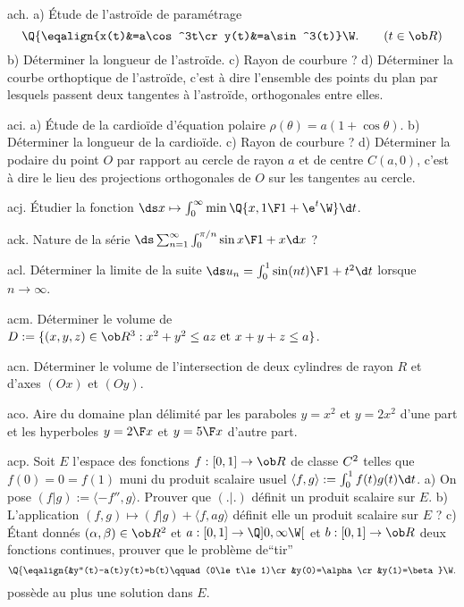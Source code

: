 \exo [Level=2,Fight=2,Learn=1,Field=\RepèreDeFrenet,Type=\Exercices,Origin=\MP] ach. 
a) \'Etude de l'astro\"ide de paramétrage
$$
\Q\{\eqalign{x(t)&=a\cos^3t\cr y(t)&=a\sin^3(t)}\W.\qquad(t\in\ob R)
$$
b) Déterminer la longueur de l'astroïde. \pn 
c) Rayon de courbure ? \pn
d) Déterminer la courbe orthoptique de l'astro\" ide, c'est à dire l'ensemble des points du plan 
par lesquels passent deux tangentes à l'astroïde, orthogonales entre elles. 

\exo [Level=2,Fight=2,Learn=1,Field=\RepèreDeFrenet,Type=\Exercices,Origin=\MP] aci. 
a) \'Etude de la cardioïde d'équation polaire $\rho(\theta)=a(1+\cos\theta)$. \pn
b) Déterminer la longueur de la cardioïde. \pn
c) Rayon de courbure ?\pn
d) Déterminer la podaire du point $O$ par rapport au cercle de rayon $a$ et de centre $C(a,0)$, 
c'est à dire le lieu des projections orthogonales de $O$ sur les tangentes au cercle. 

\exo [Level=2,Fight=1,Learn=1,Field=\FonctionsDéfiniesParUneIntégrale,Type=\Exercices,Origin=] acj. 
\'Etudier la fonction $\ds x\mapsto \int_0^\infty\min\Q\{x,{1\F1+\e^t}\W\}\d t$. 

\exo [Level=2,Fight=2,Learn=1,Field=\Séries,Type=\Exercices,Origin=] ack. 
Nature de la série $\ds\sum_{n=1}^\infty\int_0^{\pi/n}{\sin x\F1+x}\d x$ ?

\exo [Level=2,Fight=2,Learn=1,Field=\FonctionsDéfiniesParUneIntégrale,Type=\Exercices,Origin=] acl. 
Déterminer la limite de la suite $\ds u_n=\int_0^1{\sin (n t)\F 1+t^2}\d t$ lorsque $n\to\infty$. 

\exo [Level=2,Fight=1,Learn=1,Field=\Volumes,Type=\Exercices,Origin=] acm. 
Déterminer le volume de $D:=\{(x,y,z)\in\ob R^3:x^2+y^2\le az\hbox{ et }x+y+z\le a\}$. 

\exo [Level=2,Fight=1,Learn=1,Field=\Volumes,Type=\Exercices,Origin=] acn. 
Déterminer le volume de l'intersection de deux cylindres de rayon $R$ 
et d'axes $(Ox)$ et $(Oy)$. 

\exo [Level=2,Fight=1,Learn=1,Field=\Aires,Type=\Exercices,Origin=] aco. 
Aire du domaine plan délimité par les paraboles $y=x^2$ et $y=2x^2$ d'une part 
et les hyperboles $y={2\F x}$ et $y={5\F x}$ d'autre part. 

\exo [Level=1,Fight=2,Learn=1,Field=\EspacesPréHilbertiens,Type=\Exercices,Origin=] acp. 
Soit $E$ l'espace des fonctions $f:[0,1]\to \ob R$ de classe $\sc C^2$ telles que $f(0)=0=f(1)$ muni du produit scalaire usuel 
$\langle f,g\rangle:=\int_0^1f(t)g(t)\d t$. \pn
a) On pose $(f|g):=\langle-f'',g\rangle$. Prouver que $(.|.)$ définit un produit scalaire sur $E$.  \pn
b) L'application $(f,g)\mapsto(f|g)+\langle f,ag\rangle$ définit elle un produit scalaire sur $E$ ?\pn
c) \'Etant donnés $(\alpha,\beta)\in\ob R^2$ et $a:[0,1]\to\Q]0,\infty\W[$ et $b:[0,1]\to\ob R$ 
deux fonctions continues, prouver que le problème de``tir''
$$
\Q\{\eqalign{&y''(t)-a(t)y(t)=b(t)\qquad(0\le t\le 1)\cr&y(0)=\alpha\cr&y(1)=\beta}
\W.
$$
possède au plus une solution dans $E$. 

